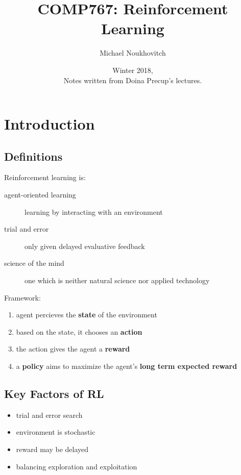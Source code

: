 \documentclass[]{article}
\theoremstyle{definition}
\begin{document}
\let\ref\Cref

\title{\bf{COMP767: Reinforcement Learning}}
\date{Winter 2018, \\ \center Notes written from Doina Precup's lectures.}
\author{Michael Noukhovitch}

\maketitle
\newpage
\tableofcontents
\newpage

\section{Introduction}
\label{sec:introduction}

\subsection{Definitions}
\label{sub:definitions}
Reinforcement learning is:
\begin{description}
    \item[agent-oriented learning] learning by interacting with an environment
    \item[trial and error] only given delayed evaluative feedback
    \item[science of the mind] one which is neither natural science nor applied technology
\end{description}

Framework:
\begin{enumerate}
    \item agent percieves the \textbf{state} of the environment
    \item based on the state, it chooses an \textbf{action}
    \item the action gives the agent a \textbf{reward}
    \item a \textbf{policy} aims to maximize the agent's \textbf{long term expected reward}
\end{enumerate}


\subsection{Key Factors of RL}
\label{sub:key_factors_of_rl}
\begin{itemize}
    \item trial and error search
    \item environment is stochastic
    \item reward may be delayed
    \item balancing exploration and exploitation
\end{itemize}
\end{document}
